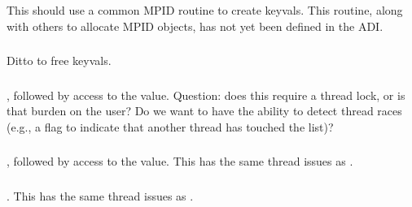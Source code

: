 \documentclass{article}
\begin{document}
\subsubsection{}
This should use a common MPID routine to create keyvals.  This routine, along
with others to allocate MPID objects, has not yet been defined in the ADI.

\subsubsection{}
Ditto to free keyvals.

\subsubsection{}


\subsubsection{}
\begin{adi3}, followed by access to the value.
Question: does this require a thread lock, or is that burden on the user?  Do
we want to have the ability to detect thread races (e.g., a flag to indicate
that another thread has touched the list)?
\end{adi3}

\subsubsection{}
\begin{adi3}, followed by access to the value.
This has the same thread issues as .
\end{adi3}

\subsubsection{}
\begin{adi3}.
This has the same thread issues as .
\end{adi3}
\end{document}
